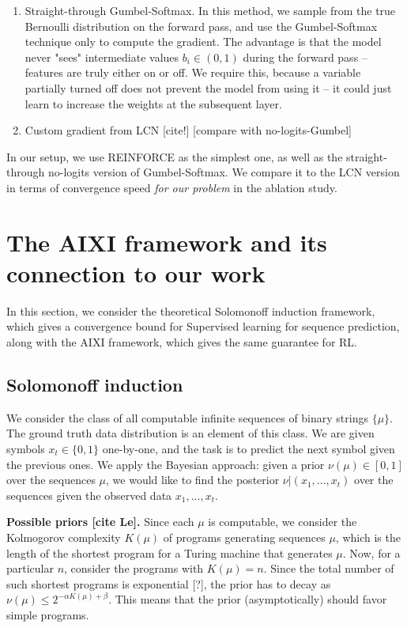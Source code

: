 \documentclass[a4paper,11pt,oneside]{report}
\begin{document}
\begin{enumerate}
    \item Straight-through Gumbel-Softmax. In this method, we sample from the true Bernoulli distribution on the forward pass, and use the Gumbel-Softmax technique only to compute the gradient. The advantage is that the model never "sees" intermediate values $b_i\in(0,1)$ during the forward pass -- features are truly either on or off. We require this, because a variable partially turned off does not prevent the model from using it -- it could just learn to increase the weights at the subsequent layer.
    \item Custom gradient from LCN [cite!] [compare with no-logits-Gumbel]
\end{enumerate}

In our setup, we use REINFORCE as the simplest one, as well as the straight-through no-logits version of Gumbel-Softmax. We compare it to the LCN version in terms of convergence speed {\em for our problem} in the ablation study.

\section{The AIXI framework and its connection to our work}
\label{sec:solomonoff_aixi}
In this section, we consider the theoretical Solomonoff induction framework, which gives a convergence bound for Supervised learning for sequence prediction, along with the AIXI framework, which gives the same guarantee for RL.

\subsection{Solomonoff induction}
\label{subsec:solomonoff}
We consider the class of all computable infinite sequences of binary strings $\{\mu\}$. The ground truth data distribution is an element of this class. We are given symbols $x_t\in \{0,1\}$ one-by-one, and the task is to predict the next symbol given the previous ones. We apply the Bayesian approach: given a prior $\nu(\mu)\in[0,1]$ over the sequences $\mu$, we would like to find the posterior $\nu|(x_1,...,x_t)$ over the sequences given the observed data $x_1,...,x_t$.

{\bf Possible priors [cite Le].} Since each $\mu$ is computable, we consider the Kolmogorov complexity $K(\mu)$ of programs generating sequences $\mu$, which is the length of the shortest program for a Turing machine that generates $\mu$. Now, for a particular $n$, consider the programs with $K(\mu)=n$. Since the total number of such shortest programs is exponential [?], the prior has to decay as $\nu(\mu)\leq 2^{-\alpha K(\mu)+\beta}$. This means that the prior (asymptotically) should favor simple programs.
\end{document}
